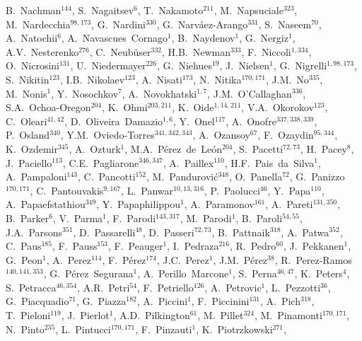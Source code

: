 B.~Nachman$^{{144}}$,
S.~Nagaitsev$^{{6}}$,
T.~Nakamoto$^{{211}}$,
M.~Napsuciale$^{{323}}$,
M.~Nardecchia$^{{98, 173}}$,
G.~Nardini$^{{330}}$,
G.~Narv{\'a}ez-Arango$^{{331}}$,
S.~Naseem$^{{70}}$,
A.~Natochii$^{{6}}$,
A.~Navascues~Cornago$^{{1}}$,
B.~Naydenov$^{{1}}$,
G.~Nergiz$^{{1}}$,
A.V.~Nesterenko$^{{276}}$,
C.~Neub{\"u}ser$^{{332}}$,
H.B.~Newman$^{{333}}$,
F.~Niccoli$^{{1, 334}}$,
O.~Nicrosini$^{{131}}$,
U.~Niedermayer$^{{226}}$,
G.~Niehues$^{{19}}$,
J.~Nielsen$^{{1}}$,
G.~Nigrelli$^{{1, 98, 173}}$,
S.~Nikitin$^{{123}}$,
I.B.~Nikolaev$^{{123}}$,
A.~Nisati$^{{173}}$,
N.~Nitika$^{{170, 171}}$,
J.M.~No$^{{335}}$,
M.~Nonis$^{{1}}$,
Y.~Nosochkov$^{{7}}$,
A.~Novokhatski$^{{1, 7}}$,
J.M.~O'Callaghan$^{{336}}$,
S.A.~Ochoa-Oregon$^{{204}}$,
K.~Ohmi$^{{203, 211}}$,
K.~Oide$^{{1, 14, 211}}$,
V.A.~Okorokov$^{{123}}$,
C.~Oleari$^{{41, 42}}$,
D.~Oliveira~Damazio$^{{1, 6}}$,
Y.~Onel$^{{117}}$,
A.~Onofre$^{{337, 338, 339}}$,
P.~Osland$^{{340}}$,
Y.M.~Oviedo-Torres$^{{341, 342, 343}}$,
A.~Ozansoy$^{{67}}$,
F.~Ozaydin$^{{95, 344}}$,
K.~Ozdemir$^{{345}}$,
A.~Ozturk$^{{1}}$,
M.A.~P{\'e}rez~de~Le{\'o}n$^{{204}}$,
S.~Pacetti$^{{72, 73}}$,
H.~Pacey$^{{8}}$,
J.~Paciello$^{{113}}$,
C.E.~Pagliarone$^{{346, 347}}$,
A.~Paillex$^{{110}}$,
H.F.~Pais~da~Silva$^{{1}}$,
A.~Pampaloni$^{{143}}$,
C.~Pancotti$^{{152}}$,
M.~Pandurovi{\'c}$^{{348}}$,
O.~Panella$^{{72}}$,
G.~Panizzo$^{{170, 171}}$,
C.~Pantouvakis$^{{9, 167}}$,
L.~Panwar$^{{10, 13, 316}}$,
P.~Paolucci$^{{46}}$,
Y.~Papa$^{{110}}$,
A.~Papaefstathiou$^{{349}}$,
Y.~Papaphilippou$^{{1}}$,
A.~Paramonov$^{{161}}$,
A.~Pareti$^{{131, 350}}$,
B.~Parker$^{{6}}$,
V.~Parma$^{{1}}$,
F.~Parodi$^{{143, 317}}$,
M.~Parodi$^{{1}}$,
B.~Paroli$^{{54, 55}}$,
J.A.~Parsons$^{{351}}$,
D.~Passarelli$^{{48}}$,
D.~Passeri$^{{72, 73}}$,
B.~Pattnaik$^{{318}}$,
A.~Patwa$^{{352}}$,
C.~Paus$^{{185}}$,
F.~Pauss$^{{153}}$,
F.~Peauger$^{{1}}$,
I.~Pedraza$^{{216}}$,
R.~Pedro$^{{60}}$,
J.~Pekkanen$^{{1}}$,
G.~Peon$^{{1}}$,
A.~Perez$^{{114}}$,
F.~P{\'e}rez$^{{174}}$,
J.C.~Perez$^{{1}}$,
J.M.~P{\'e}rez$^{{38}}$,
R.~Perez-Ramos$^{{140, 141, 353}}$,
G.~P{\'e}rez~Segurana$^{{1}}$,
A.~Perillo~Marcone$^{{1}}$,
S.~Perna$^{{46, 47}}$,
K.~Peters$^{{4}}$,
S.~Petracca$^{{46, 354}}$,
A.R.~Petri$^{{54}}$,
F.~Petriello$^{{126}}$,
A.~Petrovic$^{{1}}$,
L.~Pezzotti$^{{36}}$,
G.~Piacquadio$^{{71}}$,
G.~Piazza$^{{182}}$,
A.~Piccini$^{{1}}$,
F.~Piccinini$^{{131}}$,
A.~Pich$^{{318}}$,
T.~Pieloni$^{{119}}$,
J.~Pierlot$^{{1}}$,
A.D.~Pilkington$^{{61}}$,
M.~Pillet$^{{324}}$,
M.~Pinamonti$^{{170, 171}}$,
N.~Pinto$^{{235}}$,
L.~Pintucci$^{{170, 171}}$,
F.~Pinzauti$^{{1}}$,
K.~Piotrzkowski$^{{271}}$,
